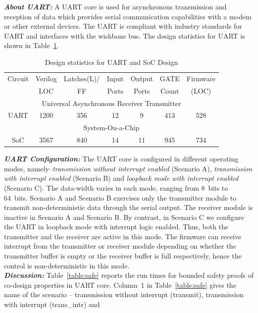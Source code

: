 \documentclass[sigconf]{acmart}
\begin{document}
\textbf{\emph{About UART:}} A UART  core is used for asynchronous
transmission and reception of data which provides serial communication
capabilities with a modem or other external devices.  The UART  is
compliant with industry standards for UART and interfaces with the wishbone
bus.  The design statistics for UART is shown in Table~\ref{table:stats}.
%
\begin{table}
\begin{center}
{
\small
\begin{tabular}{|c|c|c|c|c|c|c|}
\hline
  Circuit & Verilog & Latches(L)/ & Input & Output & GATE & Firmware \\
  & LOC & FF & Ports & Ports & Count & (LOC)\\ 
\cline{1-7}
\multicolumn{7}{|c|}{Universal Asynchronous Receiver Transmitter} \\ \hline 
  UART & 1200 & 356 & 12 & 9 & 413 & 528 \\ \hline
\multicolumn{7}{|c|}{System-On-a-Chip} \\ \hline 
  SoC & 3567 & 840 & 14 & 11 & 945 & 734 \\ \hline
\end{tabular}
}
\end{center}
\caption{Design statistics for UART and SoC Design}
\label{table:stats}
\end{table}  
%
\textbf{\emph{UART Configuration:}} The UART  core is configured in
different operating modes, namely--{\em transmission without interrupt
enabled} (Scenario A), {\em transmission with interrupt enabled} (Scenario
B) and {\em loopback mode with interrupt enabled} (Scenario C).  The
data-width varies in each mode, ranging from 8~bits to 64~bits.  Scenario A
and Scenario B exercises only the transmitter module to transmit
non-deterministic data through the serial output.  The receiver module is
inactive in Scenario A and Scenario B.  By contrast, in Scenario C we
configure the UART in loopback mode with interrupt logic enabled.  Thus,
both the transmitter and the receiver are active in this mode.  The firmware
can receive interrupt from the transmitter or receiver module depending on
whether the transmitter buffer is empty or the receiver buffer is full
respectively, hence the control is non-deterministic in this mode. \\
%
\textbf{\emph{Discussion:}}
Table~\ref{table:safe} reports the run times for bounded safety proofs of 
co-design properties in UART  core.  Column~1 in Table~\ref{table:safe} 
gives the name of the scenario -- transmission
without interrupt (transmit), transmission with interrupt (trans\_intr) and
\end{document}
